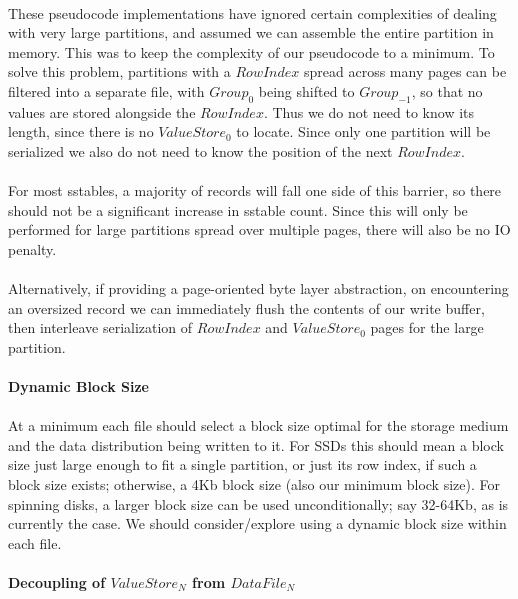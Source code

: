 \documentclass[fleqn]{article}
\begin{document}
\paragraph{}
    These pseudocode implementations have ignored certain complexities of dealing with very large
    partitions, and assumed we can assemble the entire partition in memory. This was to keep
    the complexity of our pseudocode to a minimum. To solve this problem, partitions with a $RowIndex$ 
    spread across many pages can be filtered into a separate file, with $Group_0$ being shifted to 
    $Group_{-1}$, so that no values are stored alongside the $RowIndex$. Thus we do not need to know 
    its length, since there is no $ValueStore_0$ to locate.
    Since only one partition will be serialized we also do not need to know the position of the next $RowIndex$.
    \\\\
    For most sstables, a majority of records will fall one side of this barrier, so there should not be a
    significant increase in sstable count. Since this will only be performed for large partitions spread over
    multiple pages, there will also be no IO penalty.
    \\\\
    Alternatively, if providing a page-oriented byte layer abstraction, on encountering an
    oversized record we can immediately flush the contents of our write buffer, then interleave 
    serialization of $RowIndex$ and $ValueStore_0$ pages for the large partition.
\paragraph{Dynamic Block Size}
\paragraph{}
    At a minimum each file should select a block size optimal for the storage medium and the data distribution 
    being written to it. For SSDs this should mean a block size just large enough to fit a single partition, 
    or just its row index, if such a block size exists; otherwise, a 4Kb block size (also our minimum block size).
    For spinning disks, a larger block size can be used unconditionally; say 32-64Kb, as is currently the case.
    We should consider/explore using a dynamic block size within each file.
\clearpage
\paragraph{Decoupling of $ValueStore_N$ from $DataFile_N$}
\end{document}
